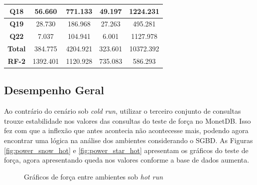 \begin{table}[t]
\begin{tabular}{|c|c|c|c|c|}
        \textbf{Q18}   & 56.660            & 771.133             & 49.197           & 1224.231            \\ \hline
        \textbf{Q19}   & 28.730            & 186.968             & 27.263           & 495.281             \\ \hline
        \textbf{Q22}   & 7.037             & 104.941             & 6.001            & 1127.978            \\ \hline
        \textbf{Total} & 384.775           & 4204.921            & 323.601          & 10372.392           \\ \hline
        \textbf{RF-2}  & 1392.401          & 1120.928            & 735.083          & 586.293             \\ \hline
        \end{tabular}
\end{table}

\subsection{Desempenho Geral}

Ao contrário do cenário sob \textit{cold run}, utilizar o terceiro conjunto de consultas trouxe estabilidade nos valores das consultas do teste de força no MonetDB. Isso fez com que a inflexão que antes acontecia não acontecesse mais, podendo agora encontrar uma lógica na análise dos ambientes considerando o SGBD. As Figuras \ref{fig:power_snow_hot} e \ref{fig:power_star_hot} apresentam os gráficos do teste de força, agora apresentando queda nos valores conforme a base de dados aumenta.

\begin{figure}[htpb]
        \centering
        \caption{Gráficos de força entre ambientes sob \textit{hot run}}
        \label{fig:power_hot}
\end{figure}

